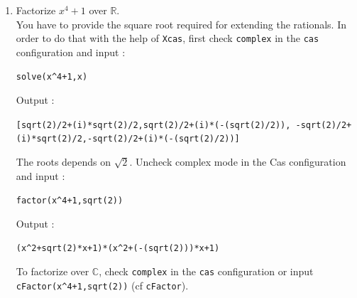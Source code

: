 \documentclass[a4paper,11pt]{book}
\begin{document}
\begin{enumerate}
Input :
\begin{center}{\tt factor(x\verb|^|4-1)}\end{center}
Output :
\begin{center}{\tt (x\verb|^|2+i)*(x\verb|^|2+-i)}\end{center}
\item  Factorize $x^4+1$ over $\mathbb R$.\\
You have to provide the square root required for extending the
rationals. In order to do that with the help of {\tt Xcas}, 
first check {\tt complex} in the {\tt cas}
configuration and  input :\\
\begin{center}{\tt solve(x\verb|^|4+1,x)}\end{center}
Output :
\begin{center}{\tt  [sqrt(2)/2+(i)*sqrt(2)/2,sqrt(2)/2+(i)*(-(sqrt(2)/2)),
 -sqrt(2)/2+(i)*sqrt(2)/2,-sqrt(2)/2+(i)*(-(sqrt(2)/2))]}\end{center}
The roots depends on $\sqrt 2$. Uncheck complex mode in the Cas configuration
and input :
\begin{center}{\tt factor(x\verb|^|4+1,sqrt(2))}\end{center}
Output :
\begin{center}{\tt (x\verb|^|2+sqrt(2)*x+1)*(x\verb|^|2+(-(sqrt(2)))*x+1)}\end{center}
To factorize over $\mathbb C$, check {\tt complex} in the 
{\tt cas} configuration or input {\tt cFactor(x\verb|^|4+1,sqrt(2))} 
(cf {\tt cFactor}).
\end{enumerate}
\end{document}
